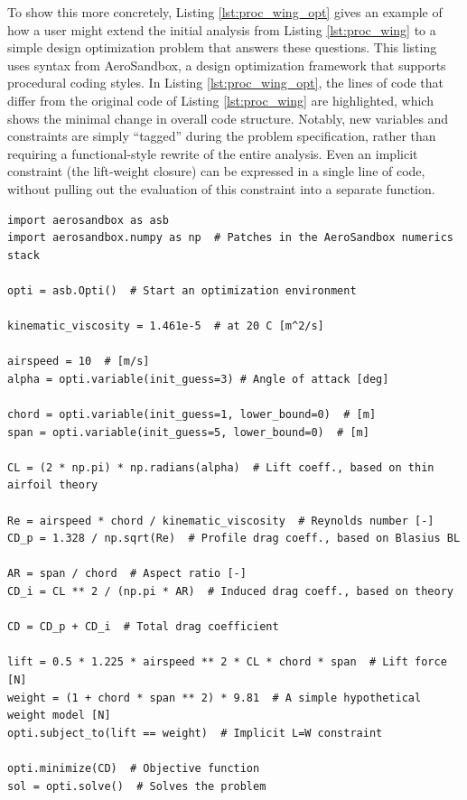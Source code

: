 \begin{enumerate}
    To show this more concretely, Listing \ref{lst:proc_wing_opt} gives an example of how a user might extend the initial analysis from Listing \ref{lst:proc_wing} to a simple design optimization problem that answers these questions. This listing uses syntax from AeroSandbox, a design optimization framework that supports procedural coding styles. In Listing \ref{lst:proc_wing_opt}, the lines of code that differ from the original code of Listing \ref{lst:proc_wing} are highlighted, which shows the minimal change in overall code structure. Notably, new variables and constraints are simply ``tagged'' during the problem specification, rather than requiring a functional-style rewrite of the entire analysis. Even an implicit constraint (the lift-weight closure) can be expressed in a single line of code, without pulling out the evaluation of this constraint into a separate function.

    \begin{listing}[H]
        \begin{verbatim}
import aerosandbox as asb
import aerosandbox.numpy as np  # Patches in the AeroSandbox numerics stack

opti = asb.Opti()  # Start an optimization environment

kinematic_viscosity = 1.461e-5  # at 20 C [m^2/s]

airspeed = 10  # [m/s]
alpha = opti.variable(init_guess=3) # Angle of attack [deg]

chord = opti.variable(init_guess=1, lower_bound=0)  # [m]
span = opti.variable(init_guess=5, lower_bound=0)  # [m]

CL = (2 * np.pi) * np.radians(alpha)  # Lift coeff., based on thin airfoil theory

Re = airspeed * chord / kinematic_viscosity  # Reynolds number [-]
CD_p = 1.328 / np.sqrt(Re)  # Profile drag coeff., based on Blasius BL

AR = span / chord  # Aspect ratio [-]
CD_i = CL ** 2 / (np.pi * AR)  # Induced drag coeff., based on theory

CD = CD_p + CD_i  # Total drag coefficient

lift = 0.5 * 1.225 * airspeed ** 2 * CL * chord * span  # Lift force [N]
weight = (1 + chord * span ** 2) * 9.81  # A simple hypothetical weight model [N]
opti.subject_to(lift == weight)  # Implicit L=W constraint

opti.minimize(CD)  # Objective function
sol = opti.solve()  # Solves the problem


\end{verbatim}
\end{listing}
\end{enumerate}
